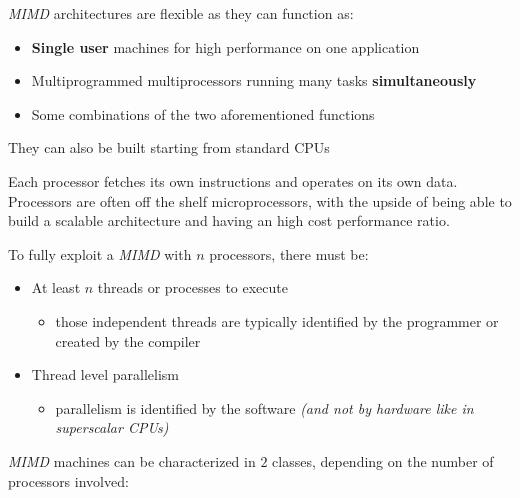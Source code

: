 \documentclass[english]{article}
\begin{document}
\textit{MIMD} architectures are flexible as they can function as:

\begin{itemize}
  \item \textbf{Single user} machines for high performance on one application
  \item Multiprogrammed multiprocessors running many tasks \textbf{simultaneously}
  \item Some combinations of the two aforementioned functions
\end{itemize}

They can also be built starting from standard CPUs

\bigskip
Each processor fetches its own instructions and operates on its own data.
Processors are often off the shelf microprocessors, with the upside of being able to build a scalable architecture and having an high cost performance ratio.

To fully exploit a \textit{MIMD} with \(n\) processors, there must be:

\begin{itemize}
  \item At least \(n\) threads or processes to execute
        \begin{itemize}
          \item those independent threads are typically identified by the programmer or created by the compiler
        \end{itemize}
  \item Thread level parallelism
        \begin{itemize}
          \item parallelism is identified by the software \textit{(and not by hardware like in superscalar CPUs)}
        \end{itemize}
\end{itemize}

\textit{MIMD} machines can be characterized in \(2\) classes, depending on the number of processors involved:
\end{document}
